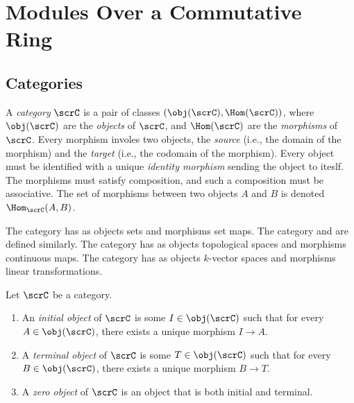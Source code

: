 
\chapter{Modules Over a Commutative Ring}

\section{Categories}

\begin{definition}
	A \emph{category} $\scrC$ is a pair of classes $(\obj(\scrC), \Hom(\scrC))$, where $\obj(\scrC)$ are the \emph{objects} of $\scrC$, and $\Hom(\scrC)$ are the \emph{morphisms} of $\scrC$. Every morphism involes two objects, the \emph{source} (i.e., the domain of the morphism) and the \emph{target} (i.e., the codomain of the morphism). Every object must be identified with a unique \emph{identity morphism} sending the object to iteslf. The morphisms must satisfy composition, and such a composition must be associative. The set of morphisms between two objects $A$ and $B$ is denoted $\Hom_\scrC(A,B)$.
\end{definition}

\begin{example}
	The category  has as objects sets and morphisms set maps. The category  and  are defined similarly. The category  has as objects topological spaces and morphisms continuous maps. The category  has as objects $k$-vector spaces and morphisms linear transformations.
\end{example}

\begin{definition}
	Let $\scrC$ be a category.
	\mbox{}
	\begin{enumerate}[label = (\arabic*),itemsep=1pt,topsep=3pt]
		\item An \emph{initial object} of $\scrC$ is some $I \in \obj(\scrC)$ such that for every $A \in \obj(\scrC)$, there exists a unique morphism $I \rightarrow A$.
		\item A \emph{terminal object} of $\scrC$ is some $T \in \obj(\scrC)$ such that for every $B \in \obj(\scrC)$, there exists a unique morphism $B \rightarrow T$.
		\item A \emph{zero object} of $\scrC$ is an object that is both initial and terminal.
	\end{enumerate}
\end{definition}

